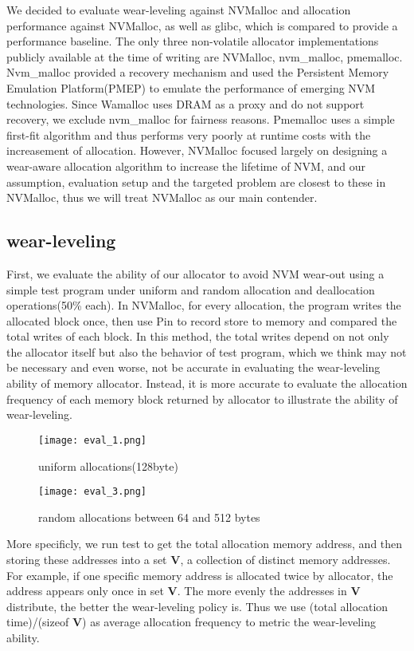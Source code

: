 \documentclass[10pt, conference, compsocconf]{IEEEtran}
\begin{document}
We decided to evaluate wear-leveling against NVMalloc and allocation performance against NVMalloc, as well as glibc,
which is compared to provide a performance baseline. 
The only three non-volatile allocator implementations publicly available at the time of writing are NVMalloc, nvm\_malloc\cite{schwalbnvm}, pmemalloc.
Nvm\_malloc provided a recovery mechanism and used the Persistent Memory Emulation Platform(PMEP)\cite{dulloor2014system} to emulate the performance of emerging NVM technologies.
Since Wamalloc uses DRAM as a proxy and do not support recovery, we exclude nvm\_malloc for fairness reasons.
Pmemalloc uses a simple first-fit algorithm and thus performs very poorly at runtime costs with the increasement of allocation.
However, NVMalloc focused largely on designing a wear-aware allocation algorithm to increase the lifetime of NVM, 
and our assumption, evaluation setup and the targeted problem are closest to these in NVMalloc, 
thus we will treat NVMalloc as our main contender.

\subsection{wear-leveling}

First, we evaluate the ability of our allocator to avoid NVM wear-out using a simple test program under uniform and random allocation and deallocation operations(50\% each).
In NVMalloc, for every allocation, the program writes the allocated block once, then use Pin\cite{luk2005pin} to record store to memory and compared the total writes of each block.
In this method, the total writes depend on not only the allocator itself but also the behavior of test program,
which we think may not be necessary and even worse, not be accurate in evaluating the wear-leveling ability of memory allocator.
Instead, it is more accurate to evaluate the allocation frequency of each memory block returned by allocator to illustrate the ability of wear-leveling.
\begin{figure}[t]
\centering
\texttt{[image: eval\_1.png]}
\caption{uniform allocations(128byte)}
\label{fig:eval_1}
\end{figure}

\begin{figure}[t]
\centering
\texttt{[image: eval\_3.png]}
\caption{random allocations between 64 and 512 bytes}
\label{fig:eval_3}
\end{figure}
More specificly, we run test to get the total allocation memory address, and then storing these addresses into a set \textbf{V},
a collection of distinct memory addresses.
For example, if one specific memory address is allocated twice by allocator, the address appears only once in set \textbf{V}.
The more evenly the addresses in \textbf{V} distribute, the better the wear-leveling policy is.
Thus we use (total allocation time)/(sizeof \textbf{V}) as average allocation frequency to metric the wear-leveling ability.
\end{document}
